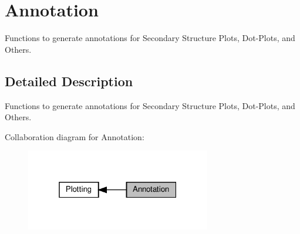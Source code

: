 \hypertarget{group__annotation__utils}{}\section{Annotation}
\label{group__annotation__utils}


Functions to generate annotations for Secondary Structure Plots, Dot-\/\+Plots, and Others.  




\subsection{Detailed Description}
Functions to generate annotations for Secondary Structure Plots, Dot-\/\+Plots, and Others. 

Collaboration diagram for Annotation\+:
\nopagebreak
\begin{figure}[H]
\begin{center}
\leavevmode
\includegraphics[width=229pt]{group__annotation__utils}
\end{center}
\end{figure}
